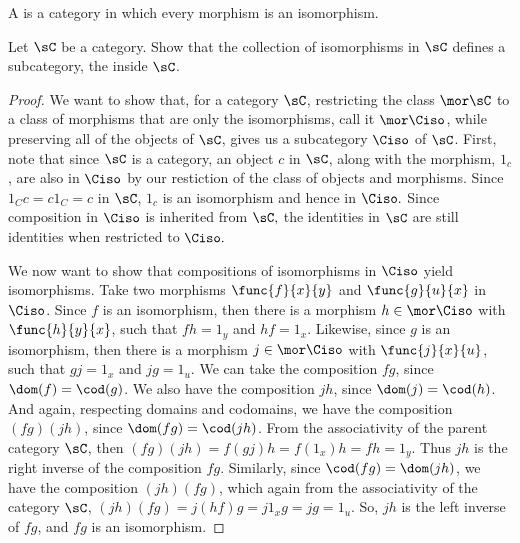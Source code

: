 \documentclass[main.tex]{subfiles}
\begin{document}
	\begin{definition}
		A  is a category in which every morphism is an isomorphism.
	\end{definition}
	\popthm
	
	\begin{exercise}
		Let \(\sC\) be a category. Show that the collection of isomorphisms in
		\(\sC\) defines a subcategory, the  inside \(\sC\).
	\end{exercise}
	
	\begin{proof}
		We want to show that, for a category \(\sC\), restricting the class
		\(\mor\sC\) to a class of morphisms that are only the isomorphisms, call it
		\(\mor\Ciso\), while preserving all of the objects of \(\sC\), gives us
		a subcategory \(\Ciso\) of \(\sC\).
		First, note that since $ \sC$ is a category, an object $c$ in $ \sC$,  
		along with the morphism, $1_c$, are also in $ \Ciso$ by our 
		restiction of the class of objects and morphisms. Since $1_Cc = c 1_C = 
		c$ in $ \sC$, $1_c$ is an isomorphism and hence in $ 
		\Ciso.$ Since composition in $ \Ciso $ is inherited from $ \sC,$  the identities in $ \sC$ are still identities when restricted to $ \Ciso.$		
		
		We now want to show that compositions of isomorphisms in \(\Ciso\) yield
		isomorphisms. Take two morphisms \(\func{f}{x}{y}\) and \(\func{g}{u}{x}\)
		in \(\Ciso\). Since \(f\) is an isomorphism, then there is a morphism
		\(h\in\mor\Ciso\) with \(\func{h}{y}{x}\), such that \(fh=1_y\) and
		\(hf=1_x\). Likewise, since \(g\) is an isomorphism, then there is a
		morphism \(j\in\mor\Ciso\) with \(\func{j}{x}{u}\), such that \(gj=1_x\)
		and \(jg=1_u\). We can take the composition \(fg\), since
		\(\dom(f)=\cod(g)\). We also have the composition \(jh\), since
		\(\dom(j)=\cod(h)\). And again, respecting domains and codomains, we have
		the composition \((fg)(jh)\), since \(\dom(fg)=\cod(jh)\). From the
		associativity of the parent category \(\sC\), then
		\((fg)(jh)=f(gj)h=f(1_x)h=fh=1_y\). Thus \(jh\) is the right inverse of the
		composition \(fg\). Similarly, since \(\cod(fg)=\dom(jh)\), we have the
		composition \((jh)(fg)\), which again from the associativity of the category
		\(\sC\), \((jh)(fg)=j(hf)g=j1_xg=jg=1_u\). So, \(jh\) is the left inverse of
		\(fg\), and \(fg\) is an isomorphism.
		

\end{proof}
\end{document}
